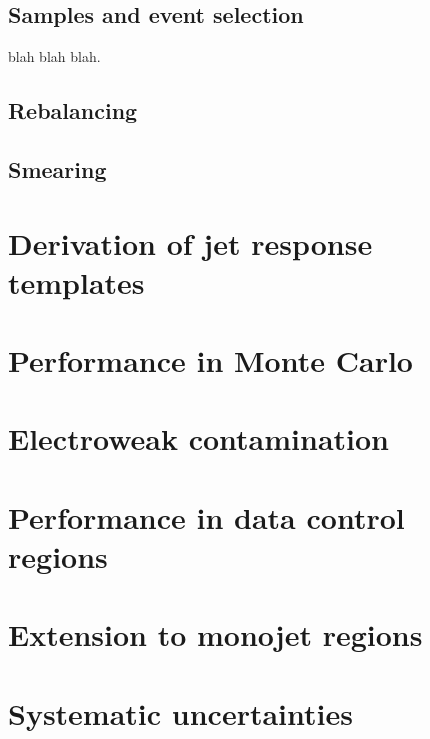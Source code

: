 \subsection{Samples and event selection}
blah blah blah.

\subsection{Rebalancing}

\subsection{Smearing}


\section{Derivation of jet response templates}
\label{sec:jrt}

\section{Performance in Monte Carlo}

\section{Electroweak contamination}

\section{Performance in data control regions}

\section{Extension to monojet regions}

\section{Systematic uncertainties}
